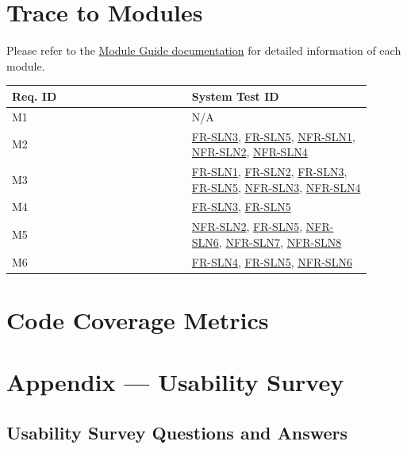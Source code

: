 \documentclass[12pt, titlepage]{article}
\begin{document}
\section{Trace to Modules}	
Please refer to the \href{https://github.com/TPGEngine/tpg/blob/main/docs/Design/SoftArchitecture/MG.pdf}{Module Guide documentation} \citep{MG} for detailed information of each module.
\begin{longtable}{|p{0.45\linewidth}|p{0.45\linewidth}|}
\hline
\textbf{Req. ID} & \textbf{System Test ID} \\
\hline
M1 & N/A\\
\hline
M2 & \hyperref[experiment_visualization]{FR-SLN3}, \hyperref[software_engineering_practices]{FR-SLN5}, \hyperref[usability]{NFR-SLN1}, \hyperref[usability]{NFR-SLN2}, \hyperref[github_actions]{NFR-SLN4} \\
\hline
M3 & \hyperref[mujoco_integration]{FR-SLN1}, \hyperref[mujoco_integration]{FR-SLN2}, \hyperref[experiment_visualization]{FR-SLN3}, \hyperref[software_engineering_practices]{FR-SLN5}, \hyperref[usability]{NFR-SLN3}, \hyperref[github_actions]{NFR-SLN4} \\
\hline
M4 & \hyperref[experiment_visualization]{FR-SLN3}, \hyperref[software_engineering_practices]{FR-SLN5} \\
\hline
M5 & \hyperref[usability]{NFR-SLN2}, \hyperref[software_engineering_practices]{FR-SLN5}, \hyperref[usability]{NFR-SLN6}, \hyperref[operational]{NFR-SLN7}, \hyperref[operational]{NFR-SLN8} \\
\hline
M6 & \hyperref[github_actions]{FR-SLN4}, \hyperref[software_engineering_practices]{FR-SLN5}, \hyperref[usability]{NFR-SLN6} \\
\hline
\end{longtable}	

\section{Code Coverage Metrics}




\newpage{}
\section{Appendix --- Usability Survey}

\subsection{Usability Survey Questions and Answers}
\end{document}
